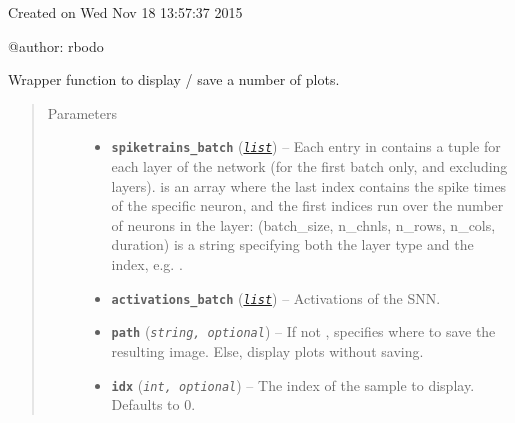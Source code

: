 \documentclass[letterpaper,10pt,english]{sphinxmanual}
\begin{document}
Created on Wed Nov 18 13:57:37 2015

@author: rbodo

\begin{fulllineitems}
\label{snntoolbox.io_utils:snntoolbox.io_utils.plotting.output_graphs}
Wrapper function to display / save a number of plots.
\begin{quote}\begin{description}
\item[{Parameters}] \leavevmode\begin{itemize}
\item {} 
\textbf{\texttt{spiketrains\_batch}} (\href{https://docs.python.org/library/functions.html\#list}{\emph{\texttt{list}}}) -- Each entry in  contains a tuple
 for each layer of the network (for the first
batch only, and excluding  layers).
 is an array where the last index contains the spike
times of the specific neuron, and the first indices run over the
number of neurons in the layer:
(batch\_size, n\_chnls, n\_rows, n\_cols, duration)
 is a string specifying both the layer type and the index,
e.g. .

\item {} 
\textbf{\texttt{activations\_batch}} (\href{https://docs.python.org/library/functions.html\#list}{\emph{\texttt{list}}}) -- Activations of the SNN.

\item {} 
\textbf{\texttt{path}} (\emph{\texttt{string, optional}}) -- If not , specifies where to save the resulting image. Else,
display plots without saving.

\item {} 
\textbf{\texttt{idx}} (\emph{\texttt{int, optional}}) -- The index of the sample to display. Defaults to 0.

\end{itemize}

\end{description}\end{quote}

\end{fulllineitems}

\end{document}
